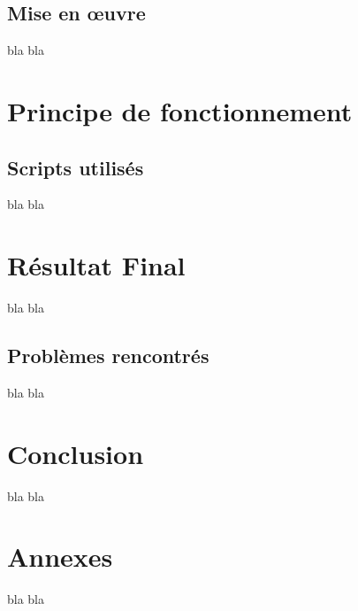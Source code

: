 \documentclass[11pt,a4paper,oneside]{article}
\begin{document}
\subsection{Mise en \oe{}uvre}
bla bla
\\
\section{Principe de fonctionnement}
\subsection{Scripts utilisés}
bla bla
\section{Résultat Final}
bla bla
\subsection{Problèmes rencontrés}
bla bla
\section{Conclusion}
bla bla
\section{Annexes}
bla bla
\end{document}
